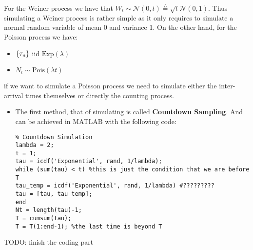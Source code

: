 \begin{recall}
For the Weiner process we have that $W_t \sim \mathcal{N}(0,t) \overset{L}{=}
\sqrt{t} \mathcal{N}(0,1)$. Thus simulating a Weiner process is rather simple as
it only requires to simulate a normal random variable of mean 0 and variance 1.
On the other hand, for the Poisson process we have:
\begin{itemize}
    \item $\{ \tau_n \}$ iid $\text{Exp}(\lambda)$
    \item $N_t \sim \text{Pois}(\lambda t)$
\end{itemize}
if we want to simulate a Poisson process we need to simulate either the
inter-arrival times themselves or directly the counting process.
\begin{itemize}
    \item The first method, that of simulating is called \textbf{Countdown
        Sampling}. And can be achieved in MATLAB with the following code:
        
\begin{verbatim}
% Countdown Simulation
lambda = 2;
t = 1;
tau = icdf('Exponential', rand, 1/lambda);
while (sum(tau) < t) %this is just the condition that we are before T
tau_temp = icdf('Exponential', rand, 1/lambda) #?????????
tau = [tau, tau_temp];
end
Nt = length(tau)-1;
T = cumsum(tau);
T = T(1:end-1); %the last time is beyond T
\end{verbatim}

\end{itemize}
\end{recall}

TODO: finish the coding part
